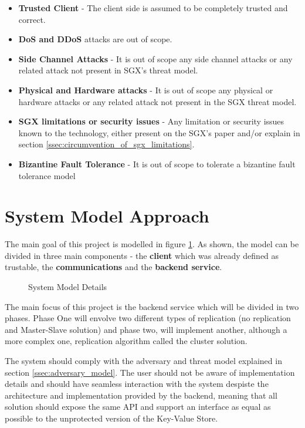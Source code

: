 \begin{itemize}
	\item \textbf{Trusted Client} - The client side is assumed to be completely trusted and correct.
	\item \textbf{\gls{DoS} and \gls{DDoS}} attacks are out of scope.
	\item \textbf{Side Channel Attacks} - It is out of scope any side channel attacks or any related attack not present in \gls{SGX}'s threat model.
	\item \textbf{Physical and Hardware attacks} - It is out of scope any physical or hardware attacks or any related attack not present in the \gls{SGX} threat model.
	\item \textbf{\gls{SGX} limitations or security issues} - Any limitation or security issues known to the technology, either present on the \gls{SGX}'s paper and/or explain in section \ref{ssec:circumvention_of_sgx_limitations}.
	\item \textbf{Bizantine Fault Tolerance} - It is out of scope to tolerate a bizantine fault tolerance model
\end{itemize}

\section{System Model Approach} %
\label{sec:system_model_approach}

The main goal of this project is modelled in figure \ref{fig:syste_model_detailed}. As shown, the model can be divided in three main components - the \textbf{client} which was already defined as trustable, the \textbf{communications} and the \textbf{backend service}. 

\begin{figure}[htbp]
  \caption{System Model Details}
  \label{fig:syste_model_detailed}
\end{figure}

The main focus of this project is the backend service which will be divided in two phases. Phase One will envolve two different types of replication (no replication and Master-Slave solution) and phase two, will implement another, although a more complex one, replication algorithm called the cluster solution.

The system should comply with the adversary and threat model explained in section \ref{ssec:adversary_model}. The user should not be aware of implementation details and should have seamless interaction with the system despiste the architecture and implementation provided by the backend, meaning that all solution should expose the same \gls{API} and support an interface as equal as possible to the unprotected version of the Key-Value Store.

